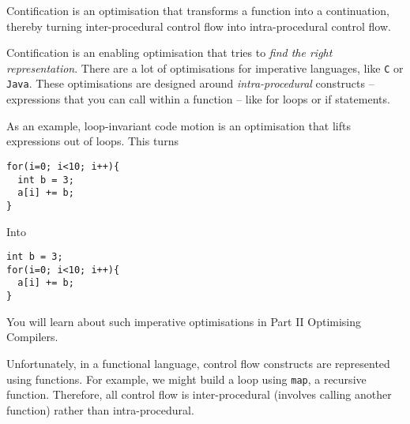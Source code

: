 Contification is an optimisation that transforms a function into a continuation, thereby turning inter-procedural control flow into intra-procedural control flow. 

Contification is an enabling optimisation that tries to \textit{find the right representation}. There are a lot of optimisations for imperative languages, like \texttt{C} or \texttt{Java}. These optimisations are designed around \textit{intra-procedural} constructs -- expressions that you can call within a function -- like for loops or if statements. 

As an example, loop-invariant code motion is an optimisation that lifts expressions out of loops. This turns
\begin{verbatim}
for(i=0; i<10; i++){
  int b = 3;
  a[i] += b;
}
\end{verbatim}
Into
\begin{verbatim}
int b = 3;
for(i=0; i<10; i++){
  a[i] += b;
}
\end{verbatim}

You will learn about such imperative optimisations in \textsf{Part II Optimising Compilers}. 

Unfortunately, in a functional language, control flow constructs are represented using functions. For example, we might build a loop using \texttt{map}, a recursive function. Therefore, all control flow is inter-procedural (involves calling another function) rather than intra-procedural. 

